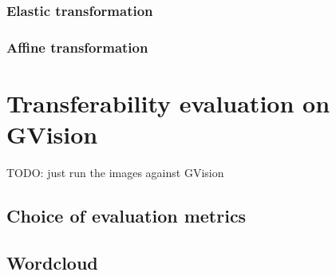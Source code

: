 \subsubsection{Elastic transformation}
\subsubsection{Affine transformation}

\section{Transferability evaluation on GVision}
TODO: just run the images against GVision

\subsection{Choice of evaluation metrics}

\subsection{Wordcloud}